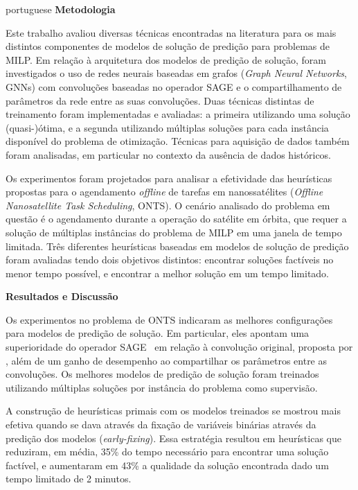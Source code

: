\begin{resumo}
\begin{otherlanguage*}{portuguese}
\noindent\textbf{\large Metodologia}\newline
{\noindent} 

Este trabalho avaliou diversas técnicas encontradas na literatura para os mais distintos componentes de modelos de solução de predição para problemas de MILP.
Em relação à arquitetura dos modelos de predição de solução, foram investigados o uso de redes neurais baseadas em grafos (\emph{Graph Neural Networks}, GNNs) com convoluções baseadas no operador SAGE e o compartilhamento de parâmetros da rede entre as suas convoluções.
Duas técnicas distintas de treinamento foram implementadas e avaliadas: a primeira utilizando uma solução (quasi-)ótima, e a segunda utilizando múltiplas soluções para cada instância disponível do problema de otimização.
Técnicas para aquisição de dados também foram analisadas, em particular no contexto da ausência de dados históricos.

Os experimentos foram projetados para analisar a efetividade das heurísticas propostas para o agendamento \emph{offline} de tarefas em nanossatélites (\emph{Offline Nanosatellite Task Scheduling}, ONTS).
O cenário analisado do problema em questão é o agendamento durante a operação do satélite em órbita, que requer a solução de múltiplas instâncias do problema de MILP em uma janela de tempo limitada.
Três diferentes heurísticas baseadas em modelos de solução de predição foram avaliadas tendo dois objetivos distintos: encontrar soluções factíveis no menor tempo possível, e encontrar a melhor solução em um tempo limitado.


\noindent\textbf{\large Resultados e Discussão}\newline

Os experimentos no problema de ONTS indicaram as melhores configurações para modelos de predição de solução.
Em particular, eles apontam uma superioridade do operador SAGE~\cite{hamiltonInductiveRepresentationLearning2017} em relação à convolução original, proposta por , além de um ganho de desempenho ao compartilhar os parâmetros entre as convoluções.
Os melhores modelos de predição de solução foram treinados utilizando múltiplas soluções por instância do problema como supervisão.

A construção de heurísticas primais com os modelos treinados se mostrou mais efetiva quando se dava através da fixação de variáveis binárias através da predição dos modelos (\emph{early-fixing}).
Essa estratégia resultou em heurísticas que reduziram, em média, 35\% do tempo necessário para encontrar uma solução factível, e aumentaram em 43\% a qualidade da solução encontrada dado um tempo limitado de 2 minutos.


\end{otherlanguage*}
\end{resumo}

